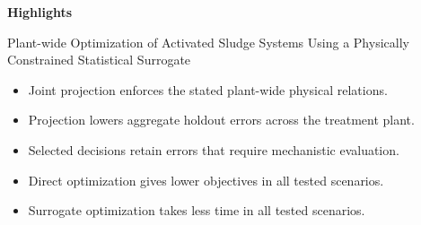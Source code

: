 \documentclass[11pt,a4paper]{article}
\begin{document}
\begin{center}
{\large\bfseries Highlights}\par
\medskip
Plant-wide Optimization of Activated Sludge Systems Using a Physically Constrained Statistical Surrogate
\end{center}

\begin{itemize}[leftmargin=*,itemsep=0.7em]
\item Joint projection enforces the stated plant-wide physical relations.
\item Projection lowers aggregate holdout errors across the treatment plant.
\item Selected decisions retain errors that require mechanistic evaluation.
\item Direct optimization gives lower objectives in all tested scenarios.
\item Surrogate optimization takes less time in all tested scenarios.
\end{itemize}
\end{document}
